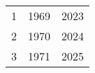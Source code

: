 % 
\begin{tabular}{ccc}
  \hline
  \hline
1 & 1969 & 2023 \\ 
  2 & 1970 & 2024 \\ 
  3 & 1971 & 2025 \\ 
   \hline
\end{tabular}
